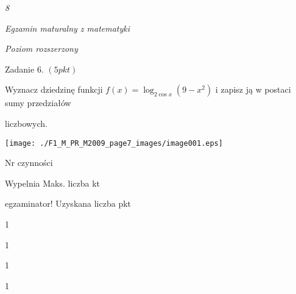 \documentclass[a4paper,12pt]{article}
\begin{document}
{\it 8}

{\it Egzamin maturalny z matematyki}

{\it Poziom rozszerzony}

Zadanie 6. $(5pkt)$

Wyznacz dziedzinę funkcji $f(x)=\log_{2\cos x}(9-x^{2})$ i zapisz ją w postaci sumy przedziałów

liczbowych.
\begin{center}
\texttt{[image: ./F1\_M\_PR\_M2009\_page7\_images/image001.eps]}
\end{center}
Nr czynności

Wypelnia Maks. liczba kt

egzaminator! Uzyskana liczba pkt

1

1

1

1
\end{document}
